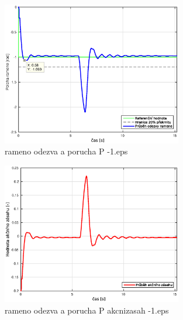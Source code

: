 \documentclass[11pt, a4paper]{article}
\begin{document}
\begin{figure}[H]
\centering
\includegraphics[width=0.7\textwidth]{dobre_grafy/rameno_odezva_a_porucha_P_-1.eps}
\caption{rameno odezva a porucha P -1.eps}
\label{ram_p_akc}
\end{figure}

\begin{figure}[H]
\centering
\includegraphics[width=0.7\textwidth]{dobre_grafy/rameno_odezva_a_porucha_P_akcnizasah_-1.eps}
\caption{rameno odezva a porucha P akcnizasah -1.eps}
\label{ram_p_akc}
\end{figure}
\end{document}
